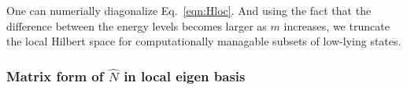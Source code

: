\documentclass{article}[12pt]
\numberwithin{equation}{section}
\begin{document}
\begin{spacing}{1.5}
One can numerially diagonalize Eq.~\ref{eqn:Hloc}.
And using the fact that the difference between the energy levels becomes larger as $m$ increases, we truncate the local Hilbert space for computationally managable subsets of low-lying states.

\subsubsection*{Matrix form of $\hat{N}$ in local eigen basis}

\end{spacing}
\end{document}
